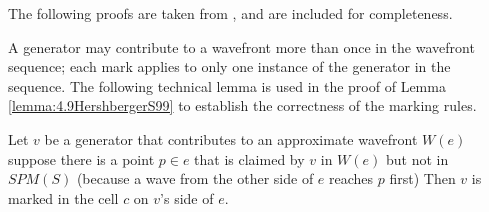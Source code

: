 The following proofs are taken from \cite{HershbergerS99}, and are included for completeness.

A generator may contribute to a wavefront more than once in the wavefront sequence; each mark 
applies to only one instance of the generator in the sequence. The following technical lemma 
is used in the proof of Lemma \ref{lemma:4.9HershbergerS99} to establish the correctness of 
the marking rules.

\begin{Lemma} \label{lemma:4.8HershbergerS99}
	Let $v$ be a generator that contributes to an approximate wavefront $W(e)$
	suppose there is a point $p \in e$ that is claimed by $v$ in $W(e)$ but not
	in $SPM(S)$ (because a wave from the other side of $e$ reaches $p$ first)
	Then $v$ is marked in the cell $c$ on $v$'s side of $e$.
\end{Lemma}
